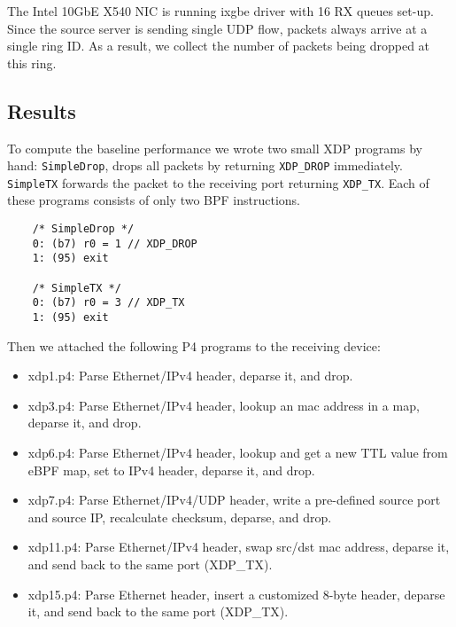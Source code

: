 The Intel 10GbE X540 NIC is running ixgbe driver with 16 RX queues
set-up. Since the source server is sending single UDP flow, packets
always arrive at a single ring ID.  As a result, we collect the number
of packets being dropped at this ring.

\subsection{Results}

To compute the baseline performance we wrote two small XDP programs by
hand: \texttt{SimpleDrop}, drops all packets by returning
\texttt{XDP\_DROP} immediately.  \texttt{SimpleTX} forwards the packet
to the receiving port returning \texttt{XDP\_TX}.  Each of these
programs consists of only two BPF instructions.

{\small
\begin{verbatim}
    /* SimpleDrop */
    0: (b7) r0 = 1 // XDP_DROP
    1: (95) exit

    /* SimpleTX */
    0: (b7) r0 = 3 // XDP_TX
    1: (95) exit
\end{verbatim}
}

Then we attached the following P4 programs to the receiving device:
\begin{itemize}
\item xdp1.p4: Parse Ethernet/IPv4 header, deparse it, and drop.
\item xdp3.p4: Parse Ethernet/IPv4 header, lookup an mac address
in a map, deparse it, and drop.
\item xdp6.p4: Parse Ethernet/IPv4 header, lookup and get a new TTL value
from eBPF map, set to IPv4 header, deparse it, and drop.
\item xdp7.p4: Parse Ethernet/IPv4/UDP header, write a pre-defined source port
and source IP, recalculate checksum, deparse, and drop.
\item xdp11.p4: Parse Ethernet/IPv4 header, swap src/dst mac address,
deparse it, and send back to the same port (XDP\_TX).
\item xdp15.p4: Parse Ethernet header, insert a customized 8-byte header,
deparse it, and send back to the same port (XDP\_TX).
\end{itemize}

